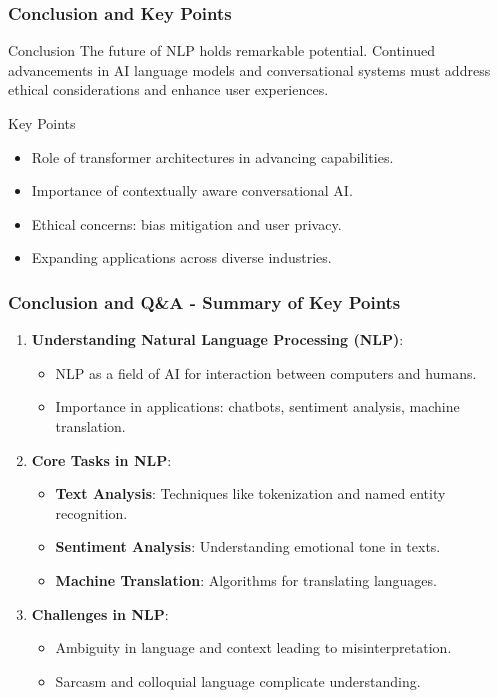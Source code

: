 \documentclass[aspectratio=169]{beamer}
\begin{document}
\begin{frame}[fragile]
    \frametitle{Conclusion and Key Points}
    \begin{block}{Conclusion}
        The future of NLP holds remarkable potential. Continued advancements in AI language models and conversational systems must address ethical considerations and enhance user experiences.
    \end{block}
    \begin{block}{Key Points}
        \begin{itemize}
            \item Role of transformer architectures in advancing capabilities.
            \item Importance of contextually aware conversational AI.
            \item Ethical concerns: bias mitigation and user privacy.
            \item Expanding applications across diverse industries.
        \end{itemize}
    \end{block}
\end{frame}

\begin{frame}[fragile]
    \frametitle{Conclusion and Q\&A - Summary of Key Points}
    \begin{enumerate}
        \item \textbf{Understanding Natural Language Processing (NLP)}:
            \begin{itemize}
                \item NLP as a field of AI for interaction between computers and humans.
                \item Importance in applications: chatbots, sentiment analysis, machine translation.
            \end{itemize}
        \item \textbf{Core Tasks in NLP}:
            \begin{itemize}
                \item \textbf{Text Analysis}: Techniques like tokenization and named entity recognition.
                \item \textbf{Sentiment Analysis}: Understanding emotional tone in texts.
                \item \textbf{Machine Translation}: Algorithms for translating languages.
            \end{itemize}
        \item \textbf{Challenges in NLP}:
            \begin{itemize}
                \item Ambiguity in language and context leading to misinterpretation.
                \item Sarcasm and colloquial language complicate understanding.
            \end{itemize}
    \end{enumerate}
\end{frame}
\end{document}
